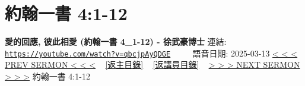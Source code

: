 \documentclass{book}
\begin{document}
\section{約翰一書 4:1-12}
\label{sec:qbcjpAyQDGE}
\textbf{愛的回應, 彼此相愛 (約翰一書 4\_1-12) - 徐武豪博士}
\newline
\newline
連結: \href{https://youtube.com/watch?v=qbcjpAyQDGE}{\texttt{https://youtube.com/watch?v=qbcjpAyQDGE}} ~~~~ 語音日期: 2025-03-13
\newline
\newline
\hyperref[sec:K8E95o7ZcvU]{< < < PREV SERMON < < <}
~
\hyperlink{toc}{[返主目錄]}
~
\hyperref[ch:preacher4]{[返講員目錄]}
~
\hyperref[sec:cau3XNPSx68]{> > > NEXT SERMON > > >}
\newline
\newline
約翰一書 4:1-12
\newline
\end{document}
